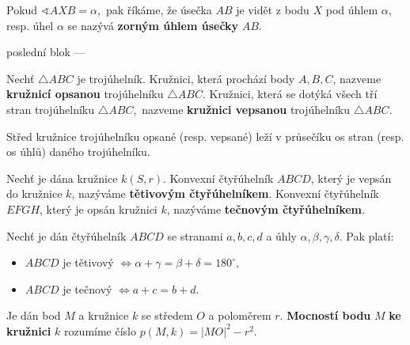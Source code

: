 \begin{pozn}
  Pokud $\sphericalangle AXB = \alpha,$ pak říkáme, že úsečka $AB$ je vidět z bodu $X$ pod úhlem $\alpha$, resp. úhel $\alpha$ se nazývá \textbf{zorným úhlem úsečky} $AB.$
\end{pozn}

poslední blok ---
\begin{definition}
  Nechť $\triangle ABC$ je trojúhelník. Kružnici, která prochází body $A,B,C$, nazveme \textbf{kružnicí opsanou} trojúhelníku $\triangle ABC.$ Kružnici, která se dotýká všech tří stran trojúhelníku $\triangle ABC,$ nazveme \textbf{kružnici vepsanou} trojúhelníku $\triangle ABC.$
\end{definition}

\begin{veta}
  Střed kružnice trojúhelníku opsané (resp. vepsané) leží v průsečíku os stran (resp. os úhlů) daného trojúhelníku.
\end{veta}

\begin{definition}
  Nechť je dána kružnice $k(S,r).$ Konvexní čtyřúhelník $ABCD$, který je vepsán do kružnice $k$, nazýváme \textbf{tětivovým čtyřúhelníkem}. Konvexní čtyřúhelník $EFGH$, který je opsán kružnici $k$, nazýváme \textbf{tečnovým čtyřúhelníkem}.
\end{definition}

\begin{veta}
  Nechť je dán čtyřúhelník $ABCD$ se stranami $a,b,c,d$ a úhly $\alpha, \beta, \gamma, \delta.$ Pak platí:
  \begin{itemize}
    \item $ABCD$ je tětivový $\iff \alpha + \gamma=\beta+\delta=180^\circ,$
    \item $ABCD$ je tečnový $\iff a+c=b+d.$
  \end{itemize}
\end{veta}

\begin{definition}
  Je dán bod $M$ a kružnice $k$ se středem $O$ a poloměrem $r$. \textbf{Mocností bodu} $M$ \textbf{ke kružnici} $k$ rozumíme číslo $p(M, k) = |MO|^2-r^2.$
\end{definition}


